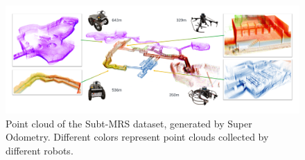 \documentclass[10pt,twocolumn,letterpaper]{article}
\begin{document}


\begin{figure}[ht!]
    \centering
    \includegraphics[width=0.9\linewidth]{figure/subt_v2.png}
    \caption{Point cloud of the Subt-MRS dataset, generated by Super Odometry\cite{zhao2021super}. Different colors represent point clouds collected by different robots. }
    \label{fig:subt_pointcloud}
\end{figure}

\end{document}
